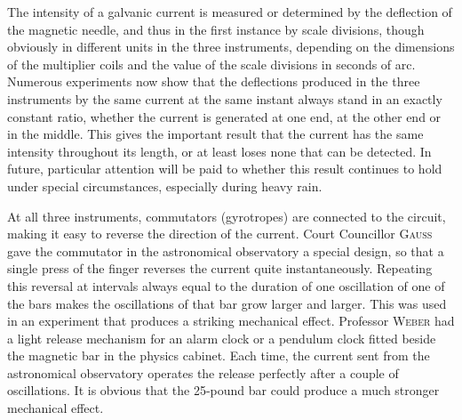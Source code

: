The intensity of a galvanic current is measured or determined by the deflection of the magnetic needle, and thus in the first instance by scale divisions, though
obviously in different units in the three instruments, depending on the dimensions of the multiplier coils and the value of the scale divisions in seconds of arc. Numerous experiments now show that the deflections produced in the three instruments by the same current at the same instant always stand in an exactly constant ratio, whether the current is generated at one end, at the other end or in the middle. This gives the important result that the current has the same intensity throughout its length, or at least loses none that can be detected. In future, particular attention will be paid to whether this result continues to hold under special circumstances, especially during heavy rain.

At all three instruments, commutators (gyrotropes) are connected to the circuit, making it easy to reverse the direction of the current. Court Councillor \textsc{Gauss} gave the commutator in the astronomical observatory a special design, so that a single press of the finger reverses the current quite instantaneously. Repeating this reversal at intervals always equal to the duration of one oscillation of one of the bars makes the oscillations of that bar grow larger and larger. This was used in an experiment that produces a striking mechanical effect. Professor \textsc{Weber} had a light release mechanism for an alarm clock or a pendulum clock fitted beside the magnetic bar in the physics cabinet. Each time, the current sent from the astronomical observatory operates the release perfectly after a couple of oscillations. It is obvious that the 25-pound bar could produce a much stronger mechanical effect.


